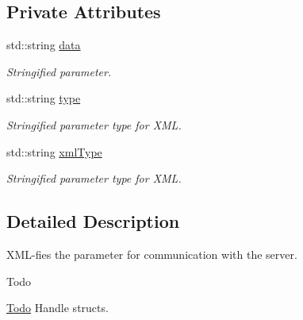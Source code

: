 \subsection*{Private Attributes}
\begin{DoxyCompactItemize}
\item 
\hypertarget{classGbxParameter_a6b64cfaae4d5b3b498fb2cdd3d28f824}{std\-::string \hyperlink{classGbxParameter_a6b64cfaae4d5b3b498fb2cdd3d28f824}{data}}\label{classGbxParameter_a6b64cfaae4d5b3b498fb2cdd3d28f824}

\begin{DoxyCompactList}\small\item\em Stringified parameter. \end{DoxyCompactList}\item 
\hypertarget{classGbxParameter_a19d4cab065cb0440c675e97babf45d02}{std\-::string \hyperlink{classGbxParameter_a19d4cab065cb0440c675e97babf45d02}{type}}\label{classGbxParameter_a19d4cab065cb0440c675e97babf45d02}

\begin{DoxyCompactList}\small\item\em Stringified parameter type for X\-M\-L. \end{DoxyCompactList}\item 
\hypertarget{classGbxParameter_ad5182c3df0c77e011c61e00e182f8a49}{std\-::string \hyperlink{classGbxParameter_ad5182c3df0c77e011c61e00e182f8a49}{xml\-Type}}\label{classGbxParameter_ad5182c3df0c77e011c61e00e182f8a49}

\begin{DoxyCompactList}\small\item\em Stringified parameter type for X\-M\-L. \end{DoxyCompactList}\end{DoxyCompactItemize}


\subsection{Detailed Description}
X\-M\-L-\/fies the parameter for communication with the server. 

\begin{DoxyRefDesc}{Todo}
\item[\hyperlink{todo__todo000003}{Todo}]Handle structs. \end{DoxyRefDesc}


